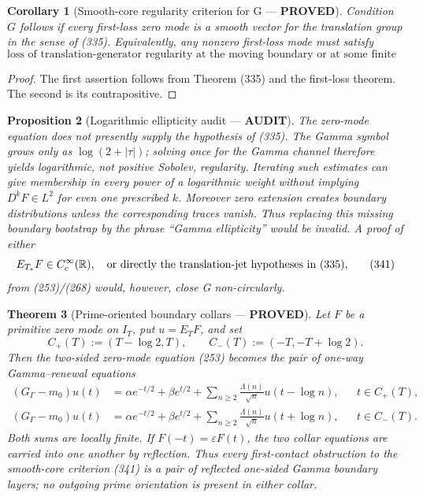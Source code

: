 \documentclass[11pt]{article}
\newtheorem{theorem}{Theorem}
\newtheorem{proposition}[theorem]{Proposition}
\newtheorem{corollary}[theorem]{Corollary}
\newcommand{\PROVED}{\textcolor{green!45!black}{\textbf{PROVED}}}
\newcommand{\AUDIT}{\textcolor{orange!75!black}{\textbf{AUDIT}}}
\begin{document}
\begin{corollary}[Smooth-core regularity criterion for G --- \PROVED]
Condition $G$ follows if every first-loss zero mode is a smooth vector for
the translation group in the sense of (335).  Equivalently, any nonzero
first-loss mode must satisfy
\begin{equation}
 \boxed{\text{loss of translation-generator regularity at the moving
 boundary or at some finite derivative order.}}       \tag{340}
\end{equation}
\end{corollary}

\begin{proof}
The first assertion follows from Theorem (335) and the first-loss theorem.
The second is its contrapositive.
\end{proof}

\begin{proposition}[Logarithmic ellipticity audit --- \AUDIT]
The zero-mode equation does not presently supply the hypothesis of (335).
The Gamma symbol grows only as $\log(2+|\tau|)$; solving once for the Gamma
channel therefore yields logarithmic, not positive Sobolev, regularity.
Iterating such estimates can give membership in every power of a logarithmic
weight without implying $D^kF\in L^2$ for even one prescribed $k$.  Moreover
zero extension creates boundary distributions unless the corresponding
traces vanish.  Thus replacing this missing boundary bootstrap by the phrase
``Gamma ellipticity'' would be invalid.  A proof of either
\begin{equation}
 E_{T_*}F\in C_c^\infty(\mathbb R),
 \quad\hbox{or directly the translation-jet hypotheses in (335),}    \tag{341}
\end{equation}
from (253)/(268) would, however, close G non-circularly.
\end{proposition}

\begin{theorem}[Prime-oriented boundary collars --- \PROVED]
Let $F$ be a primitive zero mode on $I_T$, put $u=E_TF$, and set
\begin{equation}
 C_+(T):=(T-\log2,T),\qquad
 C_-(T):=(-T,-T+\log2).                              \tag{342}
\end{equation}
Then the two-sided zero-mode equation (253) becomes the pair of one-way
Gamma--renewal equations
\begin{align}
 (G_\Gamma-m_0)u(t)
 &=\alpha e^{-t/2}+\beta e^{t/2}
   +\sum_{n\ge2}\frac{\Lambda(n)}{\sqrt n}
                         u(t-\log n),
       &&t\in C_+(T),                                \tag{343}\\
 (G_\Gamma-m_0)u(t)
 &=\alpha e^{-t/2}+\beta e^{t/2}
   +\sum_{n\ge2}\frac{\Lambda(n)}{\sqrt n}
                         u(t+\log n),
       &&t\in C_-(T).                                \tag{344}
\end{align}
Both sums are locally finite.  If $F(-t)=\varepsilon F(t)$, the two collar
equations are carried into one another by reflection.  Thus every
first-contact obstruction to the smooth-core criterion (341) is a pair of
reflected one-sided Gamma boundary layers; no outgoing prime orientation is
present in either collar.
\end{theorem}
\end{document}
